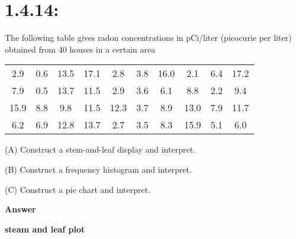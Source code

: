 \documentclass{article}
\begin{document}
\section{{\huge 1.4.14:}}
\begingroup

The following table gives radon concentrations in pCi/liter (picocurie per liter) obtained from 40 houses in a
certain area
\newline
\smallskip
\begin{center}


	\begin{tabular}{c|c|c|c|c|c|c|c|c|c}
2.9 & 0.6 & 13.5&  17.1 & 2.8 & 3.8& 16.0&  2.1 & 6.4 & 17.2 \\
7.9 & 0.5& 13.7 & 11.5 & 2.9 & 3.6 & 6.1 & 8.8 &  2.2 & 9.4 \\
15.9&  8.8 &9.8 &11.5 &12.3& 3.7& 8.9 &13.0& 7.9 &11.7 \\
6.2 & 6.9 & 12.8&  13.7 & 2.7 & 3.5 & 8.3 & 15.9 & 5.1 & 6.0 \\ 
	\end{tabular} 
\end{center}	
		


\smallskip
\smallskip 
\textsc{(A)} Construct a stem-and-leaf display and interpret.

\textsc{(B)}   Construct a frequency histogram and interpret.

\textsc{(C)}   Construct a pie chart and interpret.
\endgroup

\begin{frame}
   
\begin{center}
	\textbf{\textbf{\huge{Answer}}}\\ 
\end{center}
\end{frame}

\begingroup

	\textbf{ steam and leaf plot}
	\raggedright
	
\end{document}
